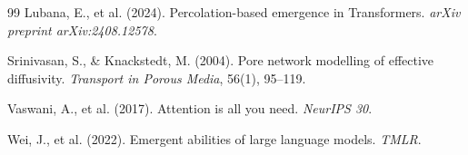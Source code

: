 \documentclass[11pt,a4paper]{article}
\begin{document}
\begin{thebibliography}{99}
Lubana, E., et al. (2024).
\newblock Percolation-based emergence in Transformers.
\newblock \emph{arXiv preprint arXiv:2408.12578}.

Srinivasan, S., \& Knackstedt, M. (2004).
\newblock Pore network modelling of effective diffusivity.
\newblock \emph{Transport in Porous Media}, 56(1), 95--119.

Vaswani, A., et al. (2017).
\newblock Attention is all you need.
\newblock \emph{NeurIPS 30}.

Wei, J., et al. (2022).
\newblock Emergent abilities of large language models.
\newblock \emph{TMLR}.

\end{thebibliography}
\end{document}
